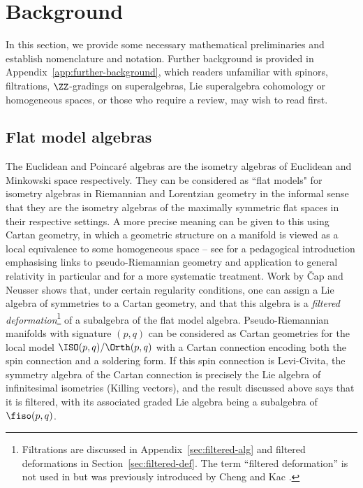 \section{Background}
\label{sec:background}

In this section, we provide some necessary mathematical preliminaries and establish nomenclature and notation. Further background is provided in Appendix~\ref{app:further-background}, which readers unfamiliar with spinors, filtrations, $\ZZ$-gradings on superalgebras, Lie superalgebra cohomology or homogeneous spaces, or those who require a review, may wish to read first.

\subsection{Flat model algebras}
\label{sec:flat-model-algs}

The Euclidean and Poincar\'e algebras are the isometry algebras of Euclidean and Minkowski space respectively. They can be considered as ``flat models" for isometry algebras in Riemannian and Lorentzian geometry in the informal sense that they are the isometry algebras of the maximally symmetric flat spaces in their respective settings. A more precise meaning can be given to this using Cartan geometry, in which a geometric structure on a manifold is viewed as a local equivalence to some homogeneous space -- see \cite{Wise2010} for a pedagogical introduction emphasising links to pseudo-Riemannian geometry and application to general relativity in particular and \cite{Cap2009_1} for a more systematic treatment. Work by \v{C}ap and Neusser \cite{Cap2009} shows that, under certain regularity conditions, one can assign a Lie algebra of symmetries to a Cartan geometry, and that this algebra is a \emph{filtered deformation}\footnote{Filtrations are discussed in Appendix~\ref{sec:filtered-alg} and filtered deformations in Section~\ref{sec:filtered-def}. The term ``filtered deformation'' is not used in \cite{Cap2009} but was previously introduced by Cheng and Kac \cite{Cheng1998}.}
of a subalgebra of the flat model algebra. Pseudo-Riemannian manifolds with signature $(p,q)$ can be considered as Cartan geometries for the local model $\ISO(p,q)/\Orth(p,q)$ with a Cartan connection encoding both the spin connection and a soldering form. If this spin connection is Levi-Civita, the symmetry algebra of the Cartan connection is precisely the Lie algebra of infinitesimal isometries (Killing vectors), and the result discussed above says that it is filtered, with its associated graded Lie algebra being a subalgebra of $\fiso(p,q)$.

